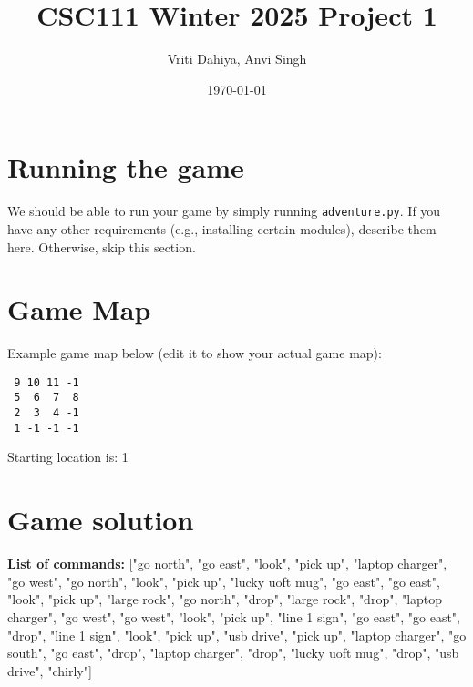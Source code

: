 \documentclass[11pt]{article}
\title{CSC111 Winter 2025 Project 1}
\author{Vriti Dahiya, Anvi Singh}
\date{\today}
\begin{document}
\maketitle

\section*{Running the game}
We should be able to run your game by simply running \texttt{adventure.py}. If you have any other requirements (e.g., installing certain modules), describe them here. Otherwise, skip this section.
\section*{Game Map}
Example game map below (edit it to show your actual game map):

\begin{verbatim}
 9 10 11 -1
 5  6  7  8
 2  3  4 -1
 1 -1 -1 -1
\end{verbatim}
Starting location is: 1
\section*{Game solution}
\textbf{List of commands:} ["go north", "go east", "look", "pick up", "laptop charger", "go west", "go north", "look", "pick up", "lucky uoft mug", "go east", "go east", "look", "pick up", "large rock", "go north", "drop", "large rock", "drop", "laptop charger", "go west", "go west", "look", "pick up", "line 1 sign", "go east", "go east", "drop", "line 1 sign", "look", "pick up", "usb drive", "pick up", "laptop charger", "go south", "go east", "drop", "laptop charger", "drop", "lucky uoft mug", "drop", "usb drive", "chirly"]\\
\end{document}
